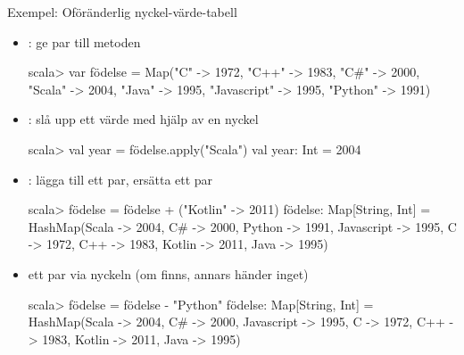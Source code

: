 \begin{Slide}{Exempel: Oföränderlig nyckel-värde-tabell}
\setlength{\leftmargini}{1em}
\begin{itemize}
\item {}: ge par till metoden  
\begin{REPLsmall}
scala> var födelse = Map("C" -> 1972,  "C++" -> 1983, "C#" -> 2000,
  "Scala" -> 2004, "Java" -> 1995, "Javascript" -> 1995, "Python" -> 1991)
\end{REPLsmall}

\item {}: slå upp ett värde med hjälp av en nyckel
\begin{REPLsmall}
scala> val year = födelse.apply("Scala")
val year: Int = 2004
\end{REPLsmall}

\item {}: lägga till ett par, ersätta ett par
\begin{REPLsmall}
scala> födelse = födelse + ("Kotlin" -> 2011)
födelse: Map[String, Int] = HashMap(Scala -> 2004, C# -> 2000, Python -> 1991, 
Javascript -> 1995, C -> 1972, C++ -> 1983, Kotlin -> 2011, Java -> 1995)
\end{REPLsmall}

\item {} ett par via nyckeln (om finns, annars händer inget)
\begin{REPLsmall}
scala> födelse = födelse - "Python"
födelse: Map[String, Int] = HashMap(Scala -> 2004, C# -> 2000, 
Javascript -> 1995, C -> 1972, C++ -> 1983, Kotlin -> 2011, Java -> 1995)
\end{REPLsmall}
\end{itemize}
\end{Slide}


